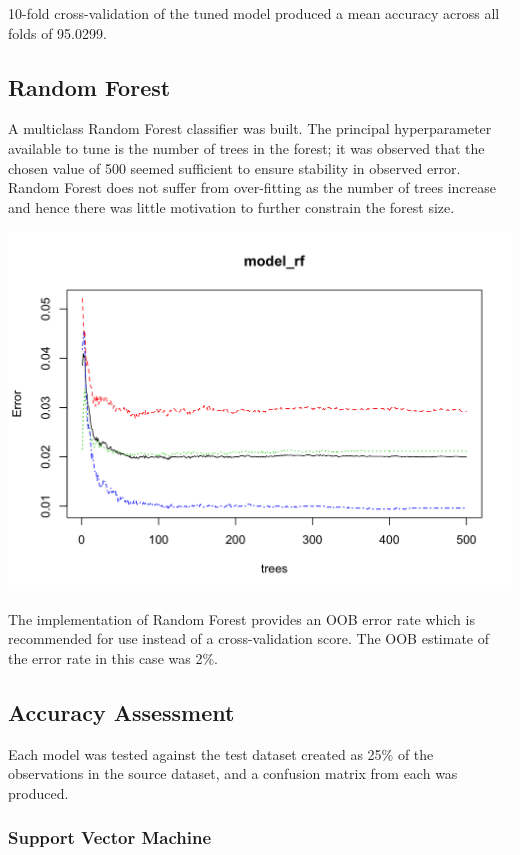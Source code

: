 \documentclass[conference]{IEEEtran}
\begin{document}
10-fold cross-validation of the tuned model produced a mean accuracy
across all folds of 95.0299.

\subsection{Random Forest}\label{sec:random-forest-1}

A multiclass Random Forest classifier was built. The principal
hyperparameter available to tune is the number of trees in the forest;
it was observed that the chosen value of 500 seemed sufficient to ensure
stability in observed error. Random Forest does not suffer from
over-fitting as the number of trees increase and hence there was little
motivation to further constrain the forest size.

\begin{center}\includegraphics[width=1\linewidth]{RF-tuning} \end{center}

The implementation of Random Forest provides an OOB error rate which is
recommended for use instead of a cross-validation score. The OOB
estimate of the error rate in this case was 2\%.

\subsection{Accuracy Assessment}\label{sec:accuracy-assessment}

Each model was tested against the test dataset created as 25\% of the
observations in the source dataset, and a confusion matrix from each was
produced.

\subsubsection{Support Vector
Machine}\label{sec:support-vector-machine-1}
\end{document}
